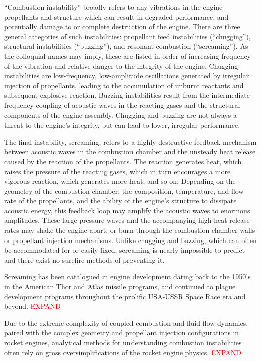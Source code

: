 ``Combustion instability'' broadly refers to any vibrations in the engine propellants and structure which can result in degraded performance, and potentially damage to or complete destruction of the engine. There are three general categories of such instabilities: propellant feed instabilities (``chugging''), structural instabilities (``buzzing''), and resonant combustion (``screaming''). As the colloquial names may imply, these are listed in order of increasing frequency of the vibration and relative danger to the integrity of the engine. Chugging instabilities are low-frequency, low-amplitude oscillations generated by irregular injection of propellants, leading to the accumulation of unburnt reactants and subsequent explosive reaction. Buzzing instabilities result from the intermediate-frequency coupling of acoustic waves in the reacting gases and the structural components of the engine assembly. Chugging and buzzing are not always a threat to the engine's integrity, but can lead to lower, irregular performance.

The final instability, screaming, refers to a highly destructive feedback mechanism between acoustic waves in the combustion chamber and the unsteady heat release caused by the reaction of the propellants. The reaction generates heat, which raises the pressure of the reacting gases, which in turn encourages a more vigorous reaction, which generates more heat, and so on. Depending on the geometry of the combustion chamber, the composition, temperature, and flow rate of the propellants, and the ability of the engine's structure to dissipate acoustic energy, this feedback loop may amplify the acoustic waves to enormous amplitudes. These large pressure waves and the accompanying high heat-release rates may shake the engine apart, or burn through the combustion chamber walls or propellant injection mechanisms. Unlike chugging and buzzing, which can often be accommodated for or easily fixed, screaming is nearly impossible to predict and there exist no surefire methods of preventing it.

Screaming has been catalogued in engine development dating back to the 1950's in the American Thor and Atlas missile programs, and continued to plague development programs throughout the prolific USA-USSR Space Race era and beyond. \textcolor{red}{EXPAND}

Due to the extreme complexity of coupled combustion and fluid flow dynamics, paired with the complex geometry and propellant injection configurations in rocket engines, analytical methods for understanding combustion instabilities often rely on gross oversimplifications of the rocket engine physics. \textcolor{red}{EXPAND}

